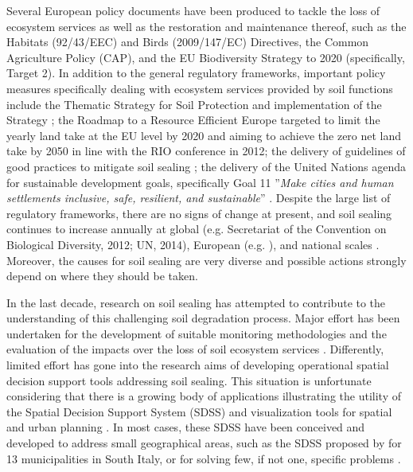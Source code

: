 \documentclass[APA,LATO1COL,doublespace]{WileyNJD-v2}
\begin{document}
Several European policy documents have been produced to tackle the loss of ecosystem services as well as the restoration and maintenance thereof, such as the Habitats (92/43/EEC) and Birds (2009/147/EC) Directives, the Common Agriculture Policy (CAP), and the EU Biodiversity Strategy to 2020 (specifically, Target 2).
In addition to the general regulatory frameworks, important policy measures specifically dealing with ecosystem services provided by soil functions include the Thematic Strategy for Soil Protection \citep{EC2006} and implementation of the Strategy \citep{EC2012}; the Roadmap to a Resource Efficient Europe \citep{EC2011a} targeted to limit the yearly land take at the EU level by 2020 and aiming to achieve the zero net land take by 2050 in line with the RIO conference in 2012; the delivery of guidelines of good practices to mitigate soil sealing \citep{SWD12}; the delivery of the United Nations agenda \citep{UN15} for sustainable development goals, specifically Goal 11 ''\textit{Make cities and human settlements inclusive, safe, resilient, and sustainable}'' \citep{Keesstra16}.
Despite the large list of regulatory frameworks, there are no signs of change at present, and soil sealing continues to increase annually \citep{FAO15} at global (e.g. Secretariat of the Convention on Biological Diversity, 2012; UN, 2014), European (e.g. \citealp{SWD12}), and national scales \citep[e.g.][Copernicus Land Monitoring Service\footnote{ http://land.copernicus.eu}]{ISPRA16,ISPRA18}.
Moreover, the causes for soil sealing are very diverse and possible actions strongly depend on where they should be taken.

In the last decade, research on soil sealing has attempted to contribute to the understanding of this challenging soil degradation process. Major effort has been undertaken for the development of suitable monitoring methodologies \citep{ISPRA18,Alvarado18} and the evaluation of the impacts over the loss of soil ecosystem services \citep{Calzolari16}. Differently, limited effort has gone into the research aims of developing operational spatial decision support tools addressing soil sealing.
This situation is unfortunate considering that there is a growing body of applications illustrating the utility of the Spatial Decision Support System (SDSS) and visualization tools for spatial and urban planning  \citep[e.g.][]{Bishop98,Geertman12,Carsjens07,Malczewski04,Malczewski06,Meyer08}.
In most cases, these SDSS have been conceived and developed to address small geographical areas, such as the SDSS proposed by \cite{Piero17} for 13 municipalities in South Italy, or for solving few, if not one, specific problems \citep[e.g.][]{Fedra98,Meyer08,Torresan16}. %
\end{document}
